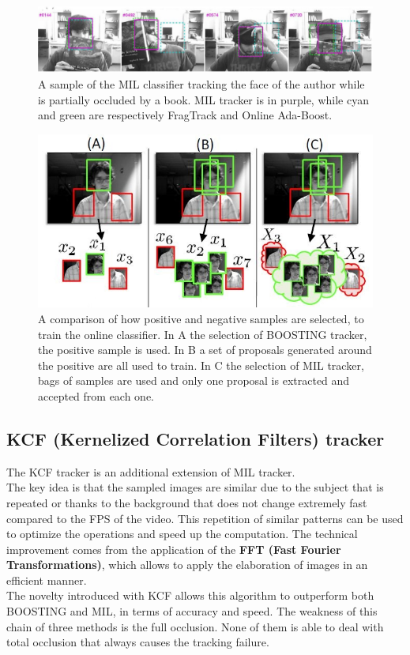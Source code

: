 \begin{figure}[!h]
	\centering
	\includegraphics[width=1\linewidth]{images/tracking/sample_MIL}
	\captionsetup{margin=0.5cm}
	\caption[Examples of partial occlusion tracking.]{A sample of the MIL classifier tracking the face of the author while is partially occluded by a book. MIL tracker is in purple, while cyan and green are respectively FragTrack\cite{fragTrack} and Online Ada-Boost\cite{onlineAdaBoostTracker}.}
	\label{fig:sample_MIL}
\end{figure}
\begin{figure}[!h]
	\centering
	\includegraphics[width=0.8\linewidth]{images/tracking/howItWorks_MIL}
	\captionsetup{margin=0.5cm}
	\caption[The bag of bounding boxes introduced as MIL novelty.]{A comparison of how positive and negative samples are selected, to train the online classifier. In A the selection of BOOSTING tracker, the positive sample is used. In B a set of proposals generated around the positive are all used to train. In C the selection of MIL tracker, bags of samples are used and only one proposal is extracted and accepted from each one.}
	\label{fig:howItWorks_MIL}
\end{figure}


\subsection{KCF (Kernelized Correlation Filters) tracker} \label{sec:kcf}
The KCF tracker\cite{kcf}\cite{kcf-withColor} is an additional extension of MIL tracker.\\
The key idea is that the sampled images are similar due to the subject that is repeated or thanks to the background that does not change extremely fast compared to the FPS of the video. This repetition of similar patterns can be used to optimize the operations and speed up the computation. The technical improvement comes from the application of the \textbf{FFT (Fast Fourier Transformations)}, which allows to apply the elaboration of images in an efficient manner.\\
The novelty introduced with KCF allows this algorithm to outperform both BOOSTING and MIL, in terms of accuracy and speed. The weakness of this chain of three methods is the full occlusion. None of them is able to deal with total occlusion that always causes the tracking failure.


